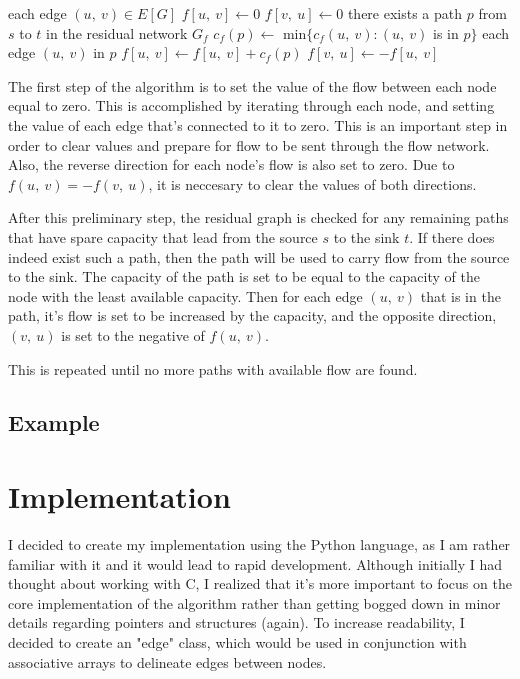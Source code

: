 \documentclass[conference]{IEEEtran}
\begin{document}
\begin{codebox}
\li \For each edge $(u,\ v) \in E[G]$
\li \Do $f[u,\ v] \leftarrow 0$
\li $f[v,\ u] \leftarrow 0$
\End
\li \While there exists a path $p$ from $s$ to $t$ in the residual network $G_f$
\li \Do $c_f(p) \leftarrow$ min$\{c_f(u,\ v) : (u,\ v)$ is in $p\}$
\li \For each edge $(u,\ v)$ in $p$
\li \Do $f[u,\ v] \leftarrow f[u,\ v] + c_f(p)$
\li $f[v,\ u] \leftarrow - f[u,\ v]$
\End
\end{codebox}

The first step of the algorithm is to set the value of the flow between each node equal to zero. This is accomplished by iterating through each node, and setting the value of each edge that's connected to it to zero. This is an important step in order to clear values and prepare for flow to be sent through the flow network. Also, the reverse direction for each node's flow is also set to zero. Due to $f(u,\ v) = - f(v,\ u)$, it is neccesary to clear the values of both directions.

After this preliminary step, the residual graph is checked for any remaining paths that have spare capacity that lead from the source $s$ to the sink $t$. If there does indeed exist such a path, then the path will be used to carry flow from the source to the sink. The capacity of the path is set to be equal to the capacity of the node with the least available capacity. Then for each edge $(u,\ v)$ that is in the path, it's flow is set to be increased by the capacity, and the opposite direction, $(v,\ u)$ is set to the negative of $f(u,\ v)$.

This is repeated until no more paths with available flow are found.

\subsection{Example}

\section{Implementation}

I decided to create my implementation using the Python language, as I am rather familiar with it and it would lead to rapid development. Although initially I had thought about working with C, I realized that it's more important to focus on the core implementation of the algorithm rather than getting bogged down in minor details regarding pointers and structures (again). To increase readability, I decided to create an "edge" class, which would be used in conjunction with associative arrays to delineate edges between nodes.
\end{document}
